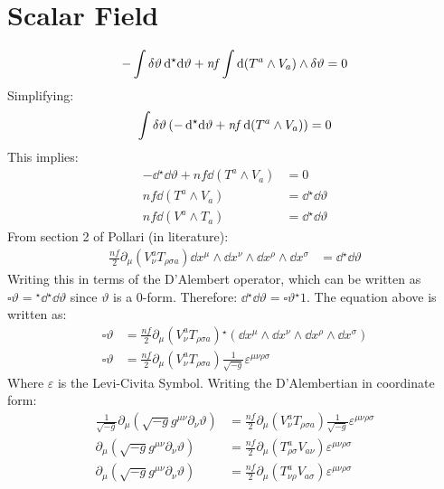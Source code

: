 \documentclass[12pt]{article}
\newcommand{\hodge}{{^\star}}
\begin{document}
\section{Scalar Field}
\begin{align*}
  - \int \var{\vartheta}\dd{\hodge{\dd{\vartheta}}} + \mathit{nf} \int \dd(T^a \wedge V_a) \wedge \var{\vartheta} = 0
\end{align*}
Simplifying:
\begin{align*}
  \int \var{\vartheta} \left(-\dd{\hodge{\dd{\vartheta}}} + \mathit{nf} \dd(T^a \wedge V_a) \right) = 0
\end{align*}
This implies:
\begin{align*}
  -\dd{\hodge{\dd{\vartheta}}} + \mathit{nf} \dd(T^a \wedge V_a) &= 0 \\
  \mathit{nf} \dd(T^a \wedge V_a) &= \dd{\hodge{\dd{\vartheta}}} \\
  \mathit{nf} \dd(V^a \wedge T_a) &= \dd{\hodge{\dd{\vartheta}}}
\end{align*}
From section 2 of Pollari (in literature):
\begin{align*}
  \frac{\mathit{nf}}{2} \partial_\mu\left(V^a_\nu T_{\rho\sigma a}\right) \dd x^\mu \wedge \dd x^\nu \wedge \dd x^\rho \wedge \dd x^\sigma &= \dd{\hodge{\dd{\vartheta}}}
\end{align*}
Writing this in terms of the D'Alembert operator, which can be written as $\square \vartheta = \hodge{\dd}\hodge{\dd\vartheta}$ since $\vartheta$ is a 0-form. Therefore: $\dd \hodge{\dd\vartheta} = \square \vartheta \hodge{1}$. The equation above is written as:
\begin{align*}
  \square \vartheta &= \frac{\mathit{nf}}{2} \partial_\mu\left(V^a_\nu T_{\rho\sigma a}\right) \hodge(\dd x^\mu \wedge \dd x^\nu \wedge \dd x^\rho \wedge \dd x^\sigma) \\
  \square \vartheta &= \frac{\mathit{nf}}{2} \partial_\mu\left(V^a_\nu T_{\rho\sigma a}\right) \frac{1}{\sqrt{-g}}\varepsilon^{\mu\nu\rho\sigma}
\end{align*}
Where $\varepsilon$ is the Levi-Civita Symbol. Writing the D'Alembertian in coordinate form:
\begin{align*}
  \frac{1}{\sqrt{-g}} \partial_\mu\left(\sqrt{-g}g^{\mu\nu}\partial_\nu \vartheta \right) &= \frac{\mathit{nf}}{2} \partial_\mu\left(V^a_\nu T_{\rho\sigma a}\right) \frac{1}{\sqrt{-g}}\varepsilon^{\mu\nu\rho\sigma} \\
  \partial_\mu\left(\sqrt{-g}g^{\mu\nu}\partial_\nu \vartheta \right) &= \frac{\mathit{nf}}{2} \partial_\mu\left(T_{\rho\sigma}^a V_{a\nu}\right) \varepsilon^{\mu\nu\rho\sigma} \\
  \partial_\mu\left(\sqrt{-g}g^{\mu\nu}\partial_\nu \vartheta \right) &= \frac{\mathit{nf}}{2} \partial_\mu\left(T_{\nu\rho}^a V_{a\sigma}\right) \varepsilon^{\mu\nu\rho\sigma}
\end{align*}
\end{document}
